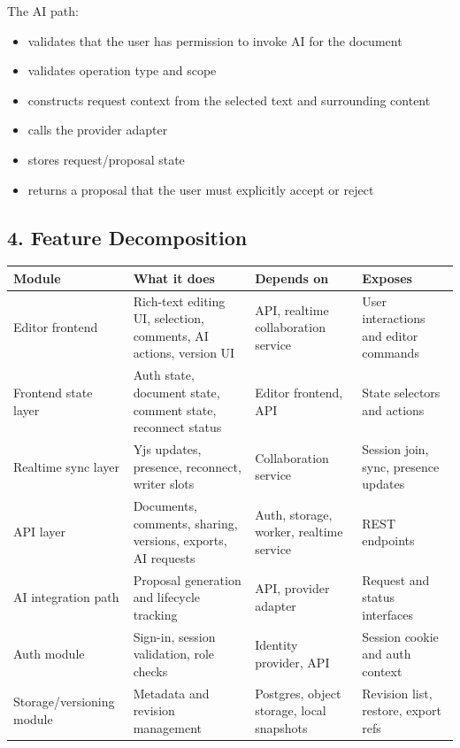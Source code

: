 \documentclass[a4paper]{article}
\providecommand{\tightlist}{%
  \setlength{\itemsep}{0pt}\setlength{\parskip}{0pt}}
\begin{document}
The AI path:

\begin{itemize}
\tightlist
\item
  validates that the user has permission to invoke AI for the document
\item
  validates operation type and scope
\item
  constructs request context from the selected text and surrounding
  content
\item
  calls the provider adapter
\item
  stores request/proposal state
\item
  returns a proposal that the user must explicitly accept or reject
\end{itemize}

\subsection{4. Feature Decomposition}\label{4-feature-decomposition}

\begin{table}[h]
\small
\begin{tabularx}{\textwidth}{@{}L{31mm}Y L{33mm} L{31mm}@{}}
\toprule
Module & What it does & Depends on & Exposes \\
\midrule
Editor frontend & Rich-text editing UI, selection, comments, AI actions, version UI & API, realtime collaboration service & User interactions and editor commands \\
Frontend state layer & Auth state, document state, comment state, reconnect status & Editor frontend, API & State selectors and actions \\
Realtime sync layer & Yjs updates, presence, reconnect, writer slots & Collaboration service & Session join, sync, presence updates \\
API layer & Documents, comments, sharing, versions, exports, AI requests & Auth, storage, worker, realtime service & REST endpoints \\
AI integration path & Proposal generation and lifecycle tracking & API, provider adapter & Request and status interfaces \\
Auth module & Sign-in, session validation, role checks & Identity provider, API & Session cookie and auth context \\
Storage/versioning module & Metadata and revision management & Postgres, object storage, local snapshots & Revision list, restore, export refs \\
\bottomrule
\end{tabularx}
\end{table}
\end{document}
